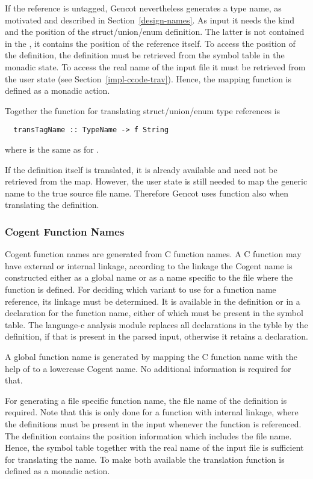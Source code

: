 If the reference is untagged, Gencot nevertheless generates a type name, as motivated and described 
in Section~\ref{design-names}. As input it needs the kind and the position of the struct/union/enum 
definition. The latter is not contained in the , it contains the position of the reference
itself. To access the position of the definition, the definition must be retrieved from the symbol table
in the monadic state. To access the real name of the input file it must be retrieved from the user
state (see Section~\ref{impl-ccode-trav}). Hence, the mapping function is defined as a monadic action. 

Together the function for translating struct/union/enum type references is
\begin{verbatim}
  transTagName :: TypeName -> f String
\end{verbatim}
where  is the same as for .

If the definition itself is translated, it is already available and need not be retrieved from the map. 
However, the user state is still needed to map the generic name  to the true source file 
name. Therefore Gencot uses function  also when translating the definition.

\subsubsection{Cogent Function Names}

Cogent function names are generated from C function names. A C function may have external or internal
linkage, according to the linkage the Cogent name is constructed either as a global name or as a name specific
to the file where the function is defined. For deciding which variant to use for a function name reference,
its linkage must be determined. It is available in the definition or in a declaration for the function name,
either of which must be present in the symbol table. The language-c analysis module replaces all 
declarations in the tyble by the
definition, if that is present in the parsed input, otherwise it retains a declaration. 

A global function name is generated by mapping the C function name with the help of  to
a lowercase Cogent name. No additional information is required for that.

For generating a file specific function name, the file name of the definition is required. Note that 
this is only done for a function with internal linkage, where the definitions must be present in
the input whenever the function is referenced. The definition contains the position information
which includes the file name. Hence, the symbol table together with the real name of the input file 
is sufficient for translating the name. To make both available the translation function is defined as 
a monadic action.

